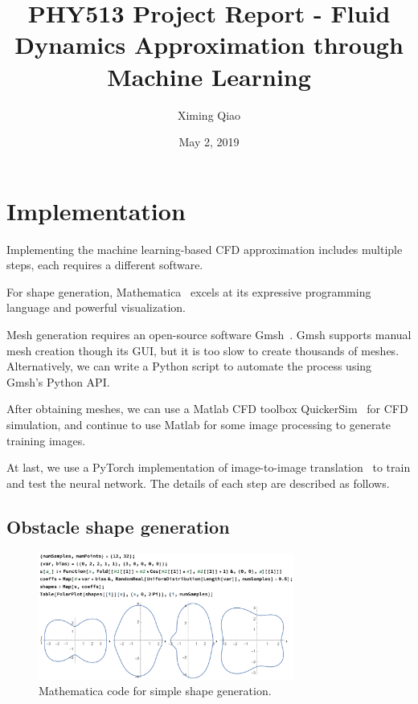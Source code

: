 \documentclass[12pt]{article}
\title{PHY513 Project Report - Fluid Dynamics Approximation through Machine 
Learning}
\author{Ximing Qiao}
\date{May 2, 2019}
\begin{document}
\maketitle



\section{Implementation}

Implementing the machine learning-based CFD approximation includes multiple 
steps, each requires a different software. 

For shape generation, Mathematica~\cite{mathematica} excels at its expressive 
programming language and powerful visualization. 

Mesh generation requires an open-source software Gmsh~\cite{Gmsh}. Gmsh 
supports manual mesh creation though its GUI, but it is too slow to create 
thousands of meshes. Alternatively, we can write a Python script to automate the 
process using Gmsh's Python API. 

After obtaining meshes, we can use a Matlab CFD toolbox 
QuickerSim~\cite{quickersim} for CFD simulation, and continue to use Matlab for 
some image processing to generate training images. 

At last, we use a PyTorch implementation of image-to-image 
translation~\cite{pix2pix} to train and test the neural network. 
The details of each step are described as follows. 

\subsection{Obstacle shape generation}

\begin{figure}[!p]
    \centering
    \includegraphics[width=0.75\textwidth]{shapes.png}
    \caption{Mathematica code for simple shape generation.}
    \label{fig:simple-shape}
\end{figure}
\end{document}
